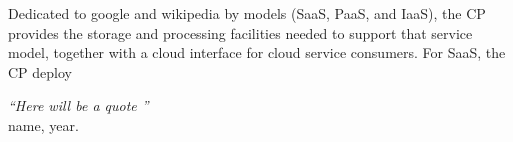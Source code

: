 \documentclass[print]{nuthesis}
\begin{document}
\begin{my_dedication}
Dedicated to google and wikipedia by models (SaaS, PaaS, and IaaS), the CP provides the storage and processing facilities
needed to support that service model, together with a cloud interface for cloud
service consumers. For SaaS, the CP deploy
\end{my_dedication}
\fi

\begin{dedication}
  {\huge \textit{``Here will be a quote ''}}\\{\footnotesize name, year.}\\ \ \\

  \vspace{4cm}
\end{dedication}






\begin{acknowledgments}
\end{acknowledgments}


\tableofcontents*

\listoffigures
\listoftables
\mainmatter
\end{document}
